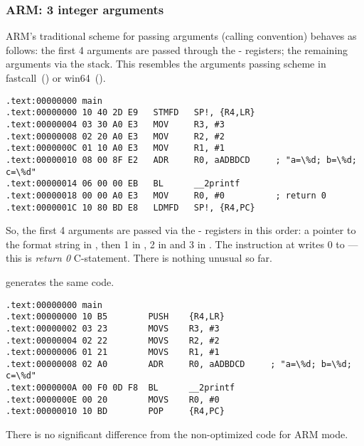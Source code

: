 \subsubsection{ARM: 3 integer arguments}

ARM's traditional scheme for passing arguments (calling convention) behaves as follows:
the first 4 arguments are passed through the - registers; the remaining arguments via the stack.
This resembles the arguments passing scheme in 
fastcall~() or win64~().


\mysubparagraph{\NonOptimizingKeilVI (\ARMMode)}

\begin{lstlisting}[caption=\NonOptimizingKeilVI (\ARMMode),style=customasmARM]
.text:00000000 main
.text:00000000 10 40 2D E9   STMFD   SP!, {R4,LR}
.text:00000004 03 30 A0 E3   MOV     R3, #3
.text:00000008 02 20 A0 E3   MOV     R2, #2
.text:0000000C 01 10 A0 E3   MOV     R1, #1
.text:00000010 08 00 8F E2   ADR     R0, aADBDCD     ; "a=\%d; b=\%d; c=\%d"
.text:00000014 06 00 00 EB   BL      __2printf
.text:00000018 00 00 A0 E3   MOV     R0, #0          ; return 0
.text:0000001C 10 80 BD E8   LDMFD   SP!, {R4,PC}
\end{lstlisting}

So, the first 4 arguments are passed via the - registers in this order:
a pointer to the \printf format string in 
, then 1 in , 2 in  and 3 in .
The instruction at  writes 0 to ---this is \emph{return 0} C-statement.
There is nothing unusual so far.

\OptimizingKeilVI generates the same code.

\mysubparagraph{\OptimizingKeilVI (\ThumbMode)}

\begin{lstlisting}[caption=\OptimizingKeilVI (\ThumbMode),style=customasmARM]
.text:00000000 main
.text:00000000 10 B5        PUSH    {R4,LR}
.text:00000002 03 23        MOVS    R3, #3
.text:00000004 02 22        MOVS    R2, #2
.text:00000006 01 21        MOVS    R1, #1
.text:00000008 02 A0        ADR     R0, aADBDCD     ; "a=\%d; b=\%d; c=\%d"
.text:0000000A 00 F0 0D F8  BL      __2printf
.text:0000000E 00 20        MOVS    R0, #0
.text:00000010 10 BD        POP     {R4,PC}
\end{lstlisting}

There is no significant difference from the non-optimized code for ARM mode.

